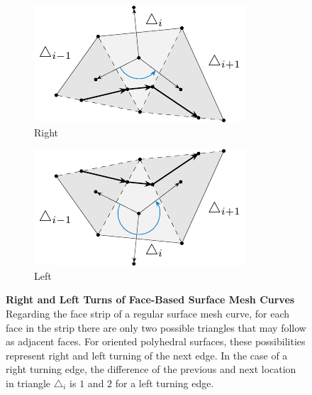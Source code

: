 \documentclass{stdlocal}
\begin{document}
  \begin{figure}
    \centering
    \begin{subfigure}[b]{0.45\linewidth}
      \centering
      \includegraphics[width=\linewidth]{figures/surface-mesh-curve-rot-right.pdf}
      \caption{Right}
    \end{subfigure}
    \hfill
    \begin{subfigure}[b]{0.45\linewidth}
      \centering
      \includegraphics[width=\linewidth]{figures/surface-mesh-curve-rot-left.pdf}
      \caption{Left}
    \end{subfigure}
    \caption[Right and Left Turns of Face-Based Surface Mesh Curves]{
      \textbf{Right and Left Turns of Face-Based Surface Mesh Curves}\\
      Regarding the face strip of a regular surface mesh curve, for each face in the strip there are only two possible triangles that may follow as adjacent faces.
      For oriented polyhedral surfaces, these possibilities represent right and left turning of the next edge.
      In the case of a right turning edge, the difference of the previous and next location in triangle $\triangle_i$ is $1$ and $2$ for a left turning edge.
    }
    \label{fig:surface-mesh-curve-turns}
  \end{figure}
\end{document}

